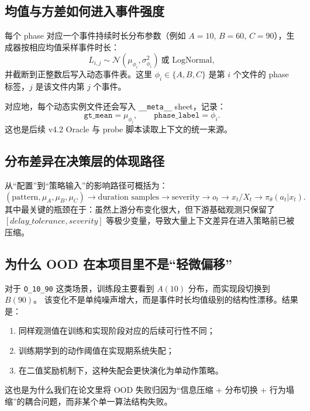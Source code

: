 ﻿\documentclass[11pt,a4paper]{ctexart}
\begin{document}
\subsection{均值与方差如何进入事件强度}
每个 phase 对应一个事件持续时长分布参数（例如 \(A=10\), \(B=60\), \(C=90\)），生成器按相应均值采样事件时长：
\begin{equation}
L_{i,j}\sim \mathcal{N}(\mu_{\phi_i},\sigma_{\phi_i}^2)\ \text{或 LogNormal},
\end{equation}
并截断到正整数后写入动态事件表。这里 \(\phi_i\in\{A,B,C\}\) 是第 \(i\) 个文件的 phase 标签，\(j\) 是该文件内第 \(j\) 个事件。

对应地，每个动态实例文件还会写入
\texttt{\_\_meta\_\_} sheet，记录：
\begin{equation}
\texttt{gt\_mean}=\mu_{\phi_i},\qquad \texttt{phase\_label}=\phi_i.
\end{equation}
这也是后续 v4.2 Oracle 与 probe 脚本读取上下文的统一来源。

\subsection{分布差异在决策层的体现路径}
从“配置”到“策略输入”的影响路径可概括为：
\begin{equation}
(\text{pattern},\mu_A,\mu_B,\mu_C)\to
\text{duration samples}\to
\text{severity}\to
o_t\to
x_t/X_t\to
\pi_\theta(a_t|x_t).
\end{equation}
其中最关键的瓶颈在于：虽然上游分布变化很大，但下游基础观测只保留了 \([delay\_tolerance,severity]\) 等极少变量，导致大量上下文差异在进入策略前已被压缩。

\subsection{为什么 OOD 在本项目里不是“轻微偏移”}
对于 \texttt{O\_10\_90} 这类场景，训练段主要看到 \(A(10)\) 分布，而实现段切换到 \(B(90)\)。
该变化不是单纯噪声增大，而是事件时长均值级别的结构性漂移。结果是：
\begin{enumerate}[leftmargin=*]
  \item 同样观测值在训练和实现阶段对应的后续可行性不同；
  \item 训练期学到的动作阈值在实现期系统失配；
  \item 在二值奖励机制下，这种失配会更快演化为单动作策略。
\end{enumerate}
这也是为什么我们在论文里将 OOD 失败归因为“信息压缩 + 分布切换 + 行为塌缩”的耦合问题，而非某个单一算法结构失败。
\end{document}

